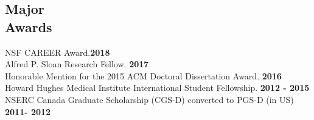 \documentclass[margin,line,letterpaper]{resume}
\begin{document}
\begin{resume}
\begin{small}
      \vspace{-2mm}
    \section{\mysidestyle Major \\Awards}
    NSF CAREER Award.\hfill \textbf{2018}\\
    Alfred P. Sloan Research Fellow.\hfill \textbf{ 2017}\\
    Honorable Mention for the 2015 ACM Doctoral Dissertation Award.\hfill \textbf{ 2016}\\
     Howard Hughes Medical Institute International Student Fellowship. \hfill \textbf{2012 - 2015}
     \\ NSERC Canada Graduate Scholarship (CGS-D) converted to PGS-D (in US) \hfill \textbf{2011- 2012} 
     
%    
%    
    

\end{small}
\end{resume}
\end{document}
